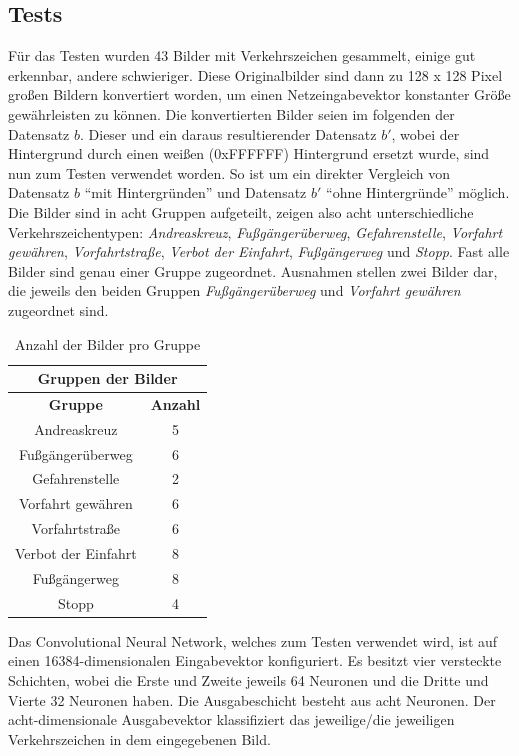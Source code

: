 \documentclass[paper=A4,pagesize=auto,12pt,headinclude=true,footinclude=true,BCOR=0mm,DIV=calc]{scrartcl}
\begin{document}
\subsection{Tests}
Für das Testen wurden  43 Bilder mit Verkehrszeichen gesammelt, einige gut erkennbar, andere schwieriger. Diese Originalbilder sind dann zu 128 x 128 Pixel großen Bildern konvertiert worden, um einen Netzeingabevektor konstanter Größe gewährleisten zu können. 
Die konvertierten Bilder seien im folgenden der Datensatz $b$. Dieser und ein daraus resultierender Datensatz $b'$, wobei der Hintergrund durch einen weißen (0xFFFFFF) Hintergrund ersetzt wurde, sind nun zum Testen verwendet worden. So ist um ein direkter Vergleich von Datensatz $b$ ``mit Hintergründen'' und Datensatz $b'$ ``ohne Hintergründe'' möglich. Die Bilder sind in acht Gruppen aufgeteilt, zeigen also acht unterschiedliche Verkehrszeichentypen: \textit{Andreaskreuz}, \textit{Fußgängerüberweg}, \textit{Gefahrenstelle}, \textit{Vorfahrt gewähren}, \textit{Vorfahrtstraße}, \textit{Verbot der Einfahrt}, \textit{Fußgängerweg} und \textit{Stopp}. Fast alle Bilder sind genau einer Gruppe zugeordnet. Ausnahmen stellen zwei Bilder dar, die jeweils den beiden Gruppen \textit{Fußgängerüberweg} und \textit{Vorfahrt gewähren} zugeordnet sind. 
\begin{table} %
	\centering
	\begin{tabular}{|c|c|}
		\hline
		\multicolumn{2}{|c|}{\textbf{Gruppen der Bilder}}\\ \hline
		\textbf{Gruppe} & \textbf{Anzahl} \\ \hline \hline
		Andreaskreuz & 5 \\ \hline
		Fußgängerüberweg & 6 \\ \hline
		Gefahrenstelle & 2 \\ \hline
		Vorfahrt gewähren & 6 \\ \hline
		Vorfahrtstraße & 6 \\ \hline
		Verbot der Einfahrt & 8 \\ \hline
		Fußgängerweg & 8 \\ \hline
		Stopp & 4 \\ \hline
	\end{tabular}
	\caption{Anzahl der Bilder pro Gruppe}
	\label{imagegroups}
\end{table}
Das Convolutional Neural Network, welches zum Testen verwendet wird, ist auf einen 16384-dimensionalen Eingabevektor konfiguriert. Es besitzt vier versteckte Schichten, wobei die Erste und Zweite jeweils 64 Neuronen und die Dritte und Vierte 32 Neuronen haben. Die Ausgabeschicht besteht aus acht Neuronen. Der acht-dimensionale Ausgabevektor klassifiziert das jeweilige/die jeweiligen Verkehrszeichen in dem eingegebenen Bild.\\
\end{document}
